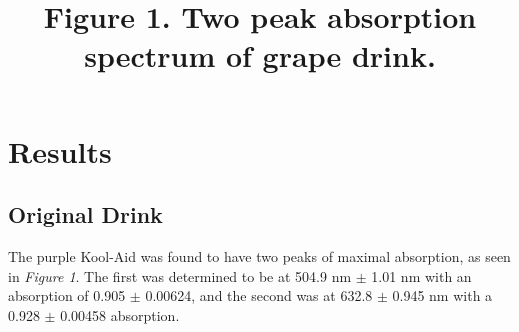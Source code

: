 \documentclass[12pt]{article}
\begin{document}
\section{Results}\singlespacing
\subsection*{Original Drink}
\begin {figure}[htb!]
  \title{\textbf{Figure 1.} Two peak absorption spectrum of grape drink.}
  \begin{center}
    	\resizebox{0.6\textwidth}{!}{}
  \end	{center}
\end {figure}
%
The purple Kool-Aid was found to have two peaks of maximal absorption, as seen in \textit{Figure 1}. The first was determined to be at 504.9 nm $\pm$ 1.01 nm with an absorption of 0.905 $\pm$ 0.00624, and the second was at 632.8 $\pm$ 0.945 nm with a 0.928 $\pm$ 0.00458 absorption.\par
\end{document}
